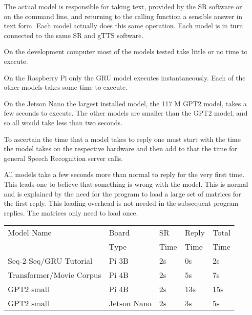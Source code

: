 The actual model is responsible for taking text, provided by the SR software or on the command line, and returning to the calling function a sensible answer in text form. Each model actually does this same operation. Each model is in turn connected to the same SR and gTTS software.

On the development computer most of the models tested take little or no time to execute.

On the Raspberry Pi only the GRU model executes instantaneously. Each of the other models takes some time to execute.

On the Jetson Nano the largest installed model, the 117 M GPT2 model, takes a few seconds to execute. The other models are smaller than the GPT2 model, and so all would take less than two seconds.

To ascertain the time that a model takes to reply one must start with the time the model takes on the respective hardware and then add to that the time for general Speech Recognition server calls.

All models take a few seconds more than normal to reply for the very first time. This leads one to believe that something is wrong with the model. This is normal and is explained by the need for the program to load a large set of matrices for the first reply. This loading overhead is not needed in the subsequent program replies. The matrices only need to load once.

\label{setup-reply-time}

\begin{table}[H]
	
	\begin{center}
		
		
		\begin{tabular}{lllll}
			
			Model Name    & Board  & SR  & Reply    & Total  \\
			&  Type & Time  & Time    & Time  \\
			\hline
			\hline
			Seq-2-Seq/GRU Tutorial & Pi 3B     & 2s & 0s             & 2s   \\
			Transformer/Movie Corpus & Pi 4B      & 2s & 5s  & 7s      \\
			GPT2 small    & Pi 4B     & 2s   & 13s         & 15s      \\
			GPT2 small    & Jetson Nano & 2s   & 3s         & 5s      \\
			\hline
		\end{tabular}
		
		\bigskip
	\end{center}
	
	
	\label{fig:time-compare}
\end{table}



